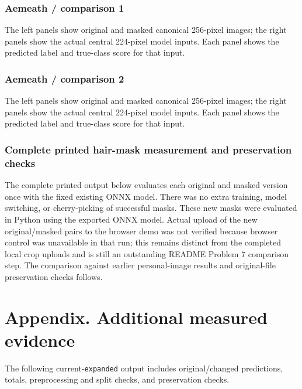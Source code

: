 \documentclass[11pt]{article}
\begin{document}
\clearpage
\subsubsection*{Aemeath / comparison 1}
The left panels show original and masked canonical 256-pixel images; the right panels show the actual central 224-pixel model inputs.
Each panel shows the predicted label and true-class score for that input.
\par\noindent {}\par

\clearpage
\subsubsection*{Aemeath / comparison 2}
The left panels show original and masked canonical 256-pixel images; the right panels show the actual central 224-pixel model inputs.
Each panel shows the predicted label and true-class score for that input.
\par\noindent {}\par

\clearpage
\subsubsection*{Complete printed hair-mask measurement and preservation checks}
The complete printed output below evaluates each original and masked version once with the fixed existing ONNX model. There was no extra training, model switching, or cherry-picking of successful masks. These new masks were evaluated in Python using the exported ONNX model. Actual upload of the new original/masked pairs to the browser demo was not verified because browser control was unavailable in that run; this remains distinct from the completed local crop uploads and is still an outstanding README Problem 7 comparison step.
The comparison against earlier personal-image results and original-file preservation checks follows.

\section*{Appendix. Additional measured evidence}
The following current-\texttt{expanded} output includes original/changed predictions, totals, preprocessing and split checks, and preservation checks.
\end{document}

